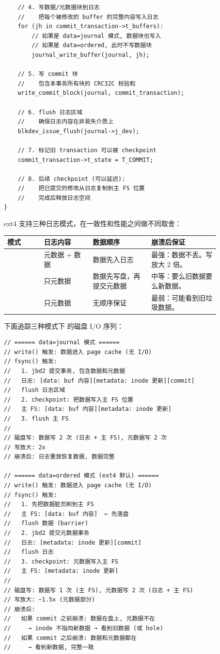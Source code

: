 \begin{filesystemlayout}
\begin{lstlisting}
    // 4. 写数据/元数据块到日志
    //    把每个被修改的 buffer 的完整内容写入日志
    for (jh in commit_transaction->t_buffers):
        // 如果是 data=journal 模式, 数据块也写入
        // 如果是 data=ordered, 此时不写数据块
        journal_write_buffer(journal, jh);

    // 5. 写 commit 块
    //    包含本事务所有块的 CRC32C 校验和
    write_commit_block(journal, commit_transaction);

    // 6. flush 日志区域
    //    确保日志内容在非易失介质上
    blkdev_issue_flush(journal->j_dev);

    // 7. 标记旧 transaction 可以被 checkpoint
    commit_transaction->t_state = T_COMMIT;

    // 8. 后续 checkpoint (可以延迟):
    //    把已提交的修改从日志复制到主 FS 位置
    //    完成后释放日志空间
}
\end{lstlisting}


ext4 支持三种日志模式，在一致性和性能之间做不同取舍：

\begin{longtable}{|F{0.15\linewidth}|F{0.20\linewidth}|F{0.24\linewidth}|F{0.28\linewidth}|}
\toprule
{}
模式 & 日志内容 & 数据顺序 & 崩溃后保证 \\
\midrule
{} & 元数据 + 数据 & 数据先入日志 & 最强：数据不丢。写放大 2 倍。 \\\tablerowrule
{} & 只元数据 & 数据先写盘，再提交元数据 & 中等：要么旧数据要么新数据。 \\\tablerowrule
{} & 只元数据 & 无顺序保证 & 最弱：可能看到旧垃圾数据。 \\
\bottomrule
\end{longtable}

下面追踪三种模式下  的磁盘 I/O 序列：

\begin{lstlisting}
// ====== data=journal 模式 ======
// write() 触发: 数据进入 page cache (无 I/O)
// fsync() 触发:
//   1. jbd2 提交事务, 包含数据和元数据
//   日志: [data: buf 内容][metadata: inode 更新][commit]
//   flush 日志区域
//   2. checkpoint: 把数据写入主 FS 位置
//   主 FS: [data: buf 内容][metadata: inode 更新]
//   3. flush 主 FS
//
// 磁盘写: 数据写 2 次 (日志 + 主 FS), 元数据写 2 次
// 写放大: 2x
// 崩溃后: 日志重放恢复数据, 数据完整

// ====== data=ordered 模式 (ext4 默认) ======
// write() 触发: 数据进入 page cache (无 I/O)
// fsync() 触发:
//   1. 先把数据脏页刷到主 FS
//   主 FS: [data: buf 内容]  ← 先落盘
//   flush 数据 (barrier)
//   2. jbd2 提交元数据事务
//   日志: [metadata: inode 更新][commit]
//   flush 日志
//   3. checkpoint: 元数据写入主 FS
//   主 FS: [metadata: inode 更新]
//
// 磁盘写: 数据写 1 次 (主 FS), 元数据写 2 次 (日志 + 主 FS)
// 写放大: ~1.5x (元数据部分)
// 崩溃后:
//   如果 commit 之前崩溃: 数据在盘上, 元数据不在
//     → inode 不指向新数据 → 看到旧数据 (或 hole)
//   如果 commit 之后崩溃: 数据和元数据都在
//     → 看到新数据, 完整一致


\end{lstlisting}
\end{filesystemlayout}
